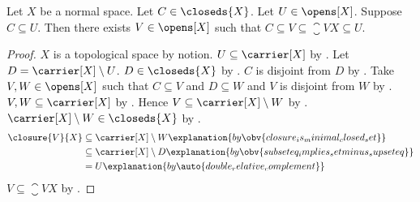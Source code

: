 \begin{proposition}\label{normal_implies_closed_shrinking}
    Let $X$ be a normal space.
    Let $C\in\closeds{X}$.
    Let $U\in\opens[X]$.
    Suppose $C\subseteq U$.
    Then there exists $V\in\opens[X]$ such that
        $C\subseteq V\subseteq\closure{V}{X}\subseteq U$.
\end{proposition}
\begin{proof}
    $X$ is a topological space by notion.
    $U\subseteq\carrier[X]$ by .
    Let $D=\carrier[X]\setminus U$.
    $D\in\closeds{X}$ by .
    $C$ is disjoint from $D$ by .
    Take $V,W\in\opens[X]$ such that
        $C\subseteq V$ and $D\subseteq W$ and
        $V$ is disjoint from $W$ by .
    $V,W\subseteq\carrier[X]$ by .
    Hence $V\subseteq\carrier[X]\setminus W$
        by .
    $\carrier[X]\setminus W\in\closeds{X}$
        by .
    \begin{align*}
        \closure{V}{X}
            &\subseteq\carrier[X]\setminus W
                \explanation{by \obv{closure_is_minimal_closed_set}}
            \\
            &\subseteq\carrier[X]\setminus D
                \explanation{by \obv{subseteq_implies_setminus_supseteq}}
            \\
            &=U
                \explanation{by \auto{double_relative_complement}}
    \end{align*}
    $V\subseteq\closure{V}{X}$
        by .
\end{proof}

